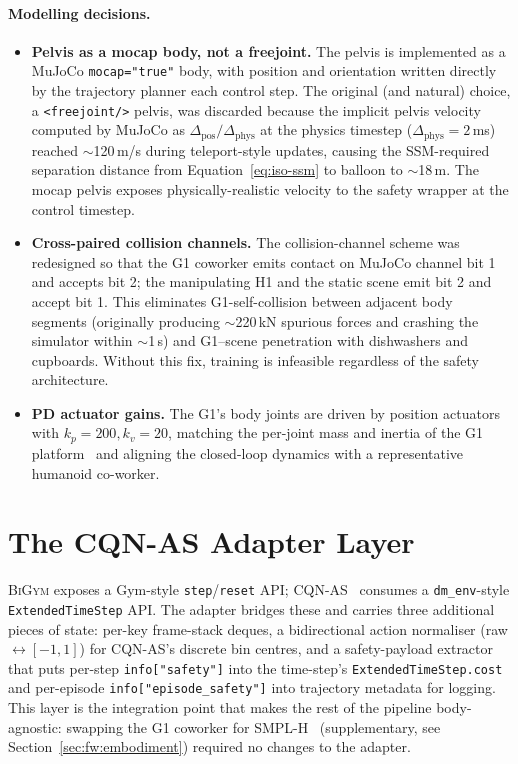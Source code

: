 \documentclass[11pt,a4paper]{report}
\newcommand{\ssm}{SSM}
\newcommand{\bigym}{\textsc{BiGym}}
\newcommand{\cqnas}{CQN-AS}
\begin{document}
\paragraph{Modelling decisions.}

\begin{itemize}[topsep=2pt,itemsep=2pt]
\item \textbf{Pelvis as a mocap body, not a freejoint.}
  The pelvis is implemented as a MuJoCo \texttt{mocap="true"} body,
  with position and orientation written directly by the trajectory
  planner each control step. The original (and natural) choice,
  a \texttt{<freejoint/>} pelvis, was discarded because the
  implicit pelvis velocity computed by MuJoCo as
  $\Delta_{\mathrm{pos}} / \Delta_{\mathrm{phys}}$ at the physics
  timestep ($\Delta_{\mathrm{phys}} = 2$\,ms) reached $\sim$120\,m/s
  during teleport-style updates, causing the \ssm{}-required
  separation distance from Equation~\ref{eq:iso-ssm} to balloon to
  $\sim$18\,m. The mocap pelvis exposes physically-realistic velocity
  to the safety wrapper at the control timestep.
\item \textbf{Cross-paired collision channels.}
  The collision-channel scheme was redesigned so that the G1
  coworker emits contact on MuJoCo channel bit 1 and accepts bit 2;
  the manipulating H1 and the static scene emit bit 2 and accept
  bit 1. This eliminates G1-self-collision between adjacent body
  segments (originally producing $\sim$220\,kN spurious forces and
  crashing the simulator within $\sim$1\,s) and G1--scene
  penetration with dishwashers and cupboards. Without this fix,
  training is infeasible regardless of the safety architecture.
\item \textbf{PD actuator gains.}
  The G1's body joints are driven by position actuators with
  $k_p = 200, k_v = 20$, matching the per-joint mass and inertia
  of the G1 platform~\cite{unitree_g1} and aligning the closed-loop
  dynamics with a representative humanoid co-worker.
\end{itemize}

\section{The \cqnas{} Adapter Layer}
\label{sec:bench:adapter}

\bigym{} exposes a Gym-style \texttt{step}/\texttt{reset} API;
\cqnas{}~\cite{seo2024cqnas} consumes a \texttt{dm\_env}-style
\texttt{ExtendedTimeStep} API. The adapter bridges these and carries
three additional pieces of state: per-key frame-stack deques, a
bidirectional action normaliser (raw $\leftrightarrow [-1,1]$) for
\cqnas{}'s discrete bin centres, and a safety-payload extractor that
puts per-step \texttt{info["safety"]} into the time-step's
\texttt{ExtendedTimeStep.cost} and per-episode
\texttt{info["episode\_safety"]} into trajectory metadata for
logging. This layer is the integration point that makes the rest of
the pipeline body-agnostic: swapping the G1
coworker for SMPL-H~\cite{romero2017smplh} (supplementary, see
Section~\ref{sec:fw:embodiment}) required no changes to the adapter.
\end{document}

